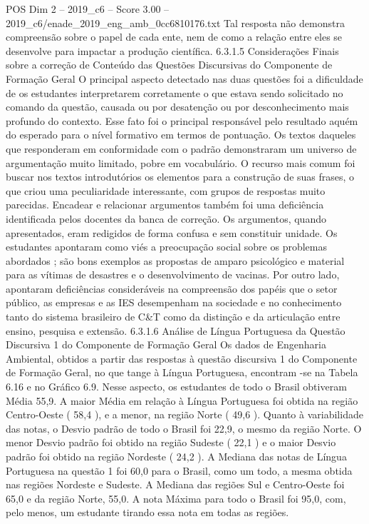 \begin{textsample}{POS Dim 2 – 2019\_c6 – Score 3.00 – 2019\_c6/enade\_2019\_eng\_amb\_0cc6810176.txt}
Tal resposta não demonstra compreensão sobre o papel de cada ente, nem de como a relação entre eles se desenvolve para impactar a produção científica. 6.3.1.5 Considerações Finais sobre a correção de Conteúdo das Questões Discursivas do Componente de Formação Geral O principal aspecto detectado nas duas questões foi a dificuldade de os estudantes interpretarem corretamente o que estava sendo solicitado no comando da questão, causada ou por desatenção ou por desconhecimento mais profundo do contexto.
Esse fato foi o principal responsável pelo resultado aquém do esperado para o nível formativo em termos de pontuação.
Os textos daqueles que responderam em conformidade com o padrão demonstraram um universo de argumentação muito limitado, pobre em vocabulário.
O recurso mais comum foi buscar nos textos introdutórios os elementos para a construção de suas frases, o que criou uma peculiaridade interessante, com grupos de respostas muito parecidas.
Encadear e relacionar argumentos também foi uma deficiência identificada pelos docentes da banca de correção.
Os argumentos, quando apresentados, eram redigidos de forma confusa e sem constituir unidade.
Os estudantes apontaram como viés a preocupação social sobre os problemas abordados ; são bons exemplos as propostas de amparo psicológico e material para as vítimas de desastres e o desenvolvimento de vacinas.
Por outro lado, apontaram deficiências consideráveis na compreensão dos papéis que o setor público, as empresas e as IES desempenham na sociedade e no conhecimento tanto do sistema brasileiro de C\&T como da distinção e da articulação entre ensino, pesquisa e extensão. 6.3.1.6 Análise de Língua Portuguesa da Questão Discursiva 1 do Componente de Formação Geral Os dados de Engenharia Ambiental, obtidos a partir das respostas à questão discursiva 1 do Componente de Formação Geral, no que tange à Língua Portuguesa, encontram -se na Tabela 6.16 e no Gráfico 6.9.
Nesse aspecto, os estudantes de todo o Brasil obtiveram Média 55,9.
A maior Média em relação à Língua Portuguesa foi obtida na região Centro-Oeste ( 58,4 ), e a menor, na região Norte ( 49,6 ).
Quanto à variabilidade das notas, o Desvio padrão de todo o Brasil foi 22,9, o mesmo da região Norte.
O menor Desvio padrão foi obtido na região Sudeste ( 22,1 ) e o maior Desvio padrão foi obtido na região Nordeste ( 24,2 ).
A Mediana das notas de Língua Portuguesa na questão 1 foi 60,0 para o Brasil, como um todo, a mesma obtida nas regiões Nordeste e Sudeste.
A Mediana das regiões Sul e Centro-Oeste foi 65,0 e da região Norte, 55,0.
A nota Máxima para todo o Brasil foi 95,0, com, pelo menos, um estudante tirando essa nota em todas as regiões.

\end{textsample}

